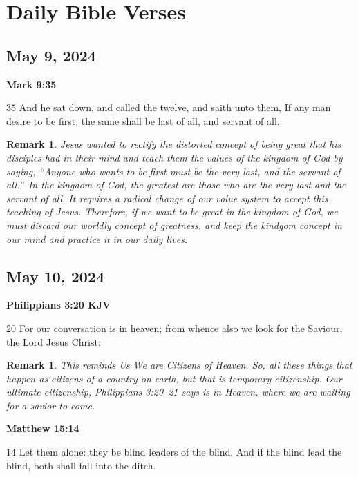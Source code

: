 \documentclass{article}
\newtheorem{remark}[theorem]{Remark}
\begin{document}
\tableofcontents

\section{Daily Bible Verses}

\subsection{\protect\bigskip May 9, 2024}

\textbf{Mark 9:35}

$35$ And he sat down, and called the twelve, and saith unto them, If any man
desire to be first, the same shall be last of all, and servant of all.

\begin{remark}
Jesus wanted to rectify the distorted concept of being great that his
disciples had in their mind and teach them the values of the kingdom of God
by saying, \textquotedblleft Anyone who wants to be first must be the very
last, and the servant of all.\textquotedblright\ In the kingdom of God, the
greatest are those who are the very last and the servant of all. It requires
a radical change of our value system to accept this teaching of Jesus.
Therefore, if we want to be great in the kingdom of God, we must discard our
worldly concept of greatness, and keep the kindgom concept in our mind and
practice it in our daily lives.
\end{remark}

\bigskip

\subsection{\protect\bigskip May 10, 2024}

\textbf{Philippians 3:20 KJV}

$20$ For our conversation is in heaven; from whence also we look for the
Saviour, the Lord Jesus Christ:

\begin{remark}
This reminds Us We are Citizens of Heaven. So, all these things that happen
as citizens of a country on earth, but that is temporary citizenship. Our
ultimate citizenship, Philippians 3:20--21 says is in Heaven, where we are
waiting for a savior to come.
\end{remark}

\textbf{Matthew 15:14}

$14$ Let them alone: they be blind leaders of the blind. And if the blind
lead the blind, both shall fall into the ditch.
\end{document}
